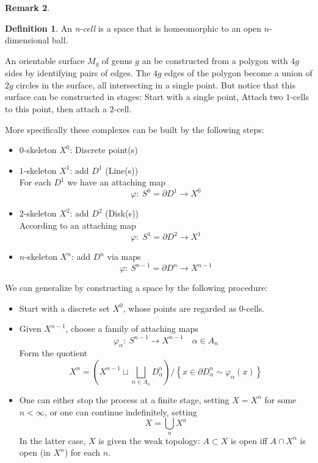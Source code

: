 \documentclass[11pt,a4paper]{article}
\theoremstyle{definition}
\newtheorem{definition}{Definition}[section]
\newtheorem{remark}[definition]{Remark}
\theoremstyle{plain}
\theoremstyle{remark}
\begin{document}
\begin{remark}
\begin{definition}
  An \emph{n-cell} is a space that is homeomorphic to an open $n$-dimensional ball.
\end{definition}

An orientable surface $M_g$ of genus $g$ an be constructed from a polygon with $4g$ sides by 
identifying pairs of edges. The $4g$ edges of the polygon become a union of $2g$ circles in the surface, all 
intersecting in a single point. But notice that this surface can be constructed in stages: Start with a single point, 
Attach two $1$-cells to this point, then attach a $2$-cell. 

More specifically these complexes can be built by the following steps: 
\begin{itemize}
  \item $0$-skeleton $X^0$: Discrete point(s)
  \item $1$-skeleton $X^1$: add $D^1$ (Line(s))\\
  For each $D^1$ we have an attaching map 
  $$\varphi \colon \: S^0 = \partial D^1 \to X^0$$
  \item $2$-skeleton $X^2$: add $D^2$ (Disk(s)) \\
  According to an attaching map 
  $$\varphi \colon \; S^1 = \partial D^2 \to X^1$$
  \item $n$-skeleton $X^n$: add $D^n$ via maps 
  $$\varphi \colon \: S^{n-1} = \partial D^n \to X^{n-1}$$
\end{itemize}

We can generalize by constructing a space by the following procedure:
\begin{itemize}
  \item Start with a discrete set $X^0$, whose points are regarded as $0$-cells. 
  \item Given $X^{n-1}$, choose a family of attaching maps
  $$\varphi_\alpha \colon \: S^{n-1} \to X^{n-1} \quad \alpha \in A_n$$
  Form the quotient 
  $$X^n = \left(X^{n-1} \sqcup \bigsqcup_{\alpha \in A_n} D_\alpha^n\right) \big/ \left\{x \in \partial D_\alpha^n \sim \varphi_\alpha(x)\right\}$$

  \item One can either stop the process at a finite stage, setting $X = X^n$ for some $n < \infty$, or one can continue indefinitely, setting 
  $$X = \bigcup_n X^n$$
  In the latter case, $X$ is given the weak topology: $A \subset X$ is open iff $A \cap X^n$ is open (in $X^n$) for each $n$.
\end{itemize}


\end{remark}
\end{document}
